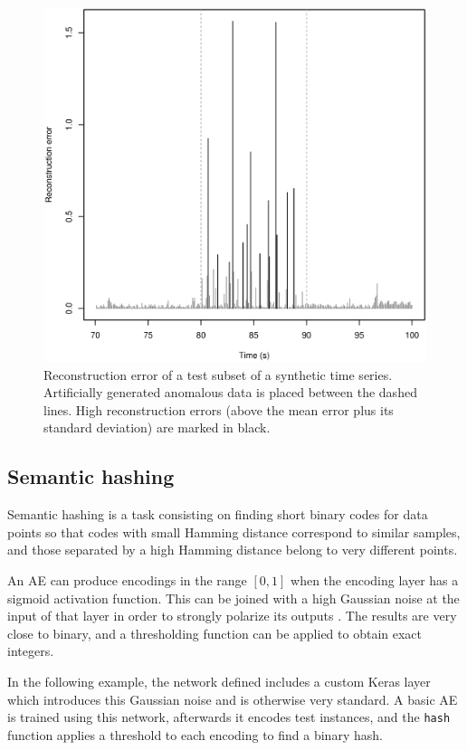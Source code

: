 \documentclass[
	fontsize=11pt, %
	twoside=false, %
	open=any, %
	secnumdepth=1, %
]{kaobook}
\begin{document}
\begin{figure}[ht]
    \centering
    \includegraphics[width=.75\textwidth]{anomaly_detection_lorenz.eps}
    \caption{Reconstruction error of a test subset of a synthetic time series. Artificially generated anomalous data is placed between the dashed lines. High reconstruction errors (above the mean error plus its standard deviation) are marked in black.}
    \label{fig:anomaly}
\end{figure}

\subsection{Semantic hashing}
\label{sec.hashing}

Semantic hashing \cite{hinton} is a task consisting on finding short binary codes for data points so that codes with small Hamming distance correspond to similar samples, and those separated by a high Hamming distance belong to very different points.

An AE can produce encodings in the range $[0,1]$ when the encoding layer has a sigmoid activation function. This can be joined with a high Gaussian noise at the input of that layer in order to strongly polarize its outputs \cite{hinton}. The results are very close to binary, and a thresholding function can be applied to obtain exact integers.

In the following example, the network defined includes a custom Keras layer which introduces this Gaussian noise and is otherwise very standard. A basic AE is trained using this network, afterwards it encodes test instances, and the \texttt{hash} function applies a threshold to each encoding to find a binary hash.
\end{document}
